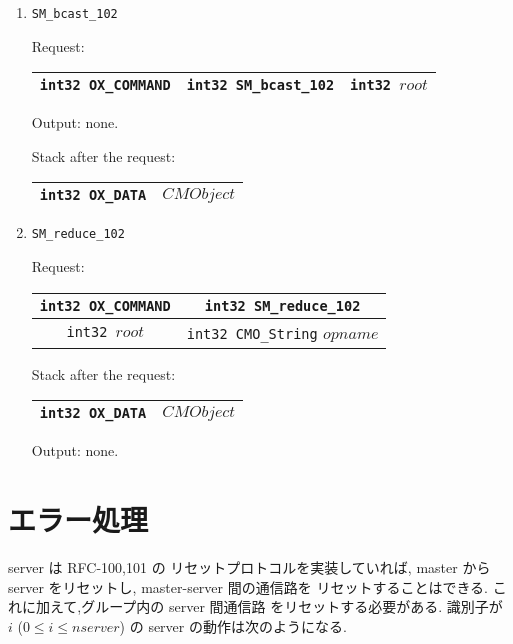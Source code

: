 \documentclass[12pt]{jarticle}
\begin{document}
\begin{enumerate}
\item
\begin{verbatim}
SM_bcast_102
\end{verbatim}

Request:
\begin{tabular}{|c|c|c|} \hline
{\tt int32 OX\_COMMAND} & {\tt int32 SM\_bcast\_102} & {\tt int32 $root$} \\ \hline
\end{tabular}

Output: none.

Stack after the request:
\begin{tabular}{|c|c|}  \hline
{\tt int32 OX\_DATA} & {\tt $CMObject$} \\ \hline
\end{tabular}

\item
\begin{verbatim}
SM_reduce_102
\end{verbatim}

Request:
\begin{tabular}{|c|c|}  \hline
{\tt int32 OX\_COMMAND} & {\tt int32 SM\_reduce\_102} \\ \hline
{\tt int32 $root$} & {\tt int32 CMO\_String} {$opname$} \\ \hline
\end{tabular}

Stack after the request:
\begin{tabular}{|c|c|}  \hline
{\tt int32 OX\_DATA} & {\tt $CMObject$} \\ \hline
\end{tabular}

Output: none.
\end{enumerate}

\section{エラー処理}

server は RFC-100,101 の リセットプロトコルを実装していれば,
master から server をリセットし, master-server 間の通信路を
リセットすることはできる. これに加えて,グループ内の server 間通信路
をリセットする必要がある. 識別子が $i$ ($0\le i \le nserver$) 
の server の動作は次のようになる.
\end{document}
